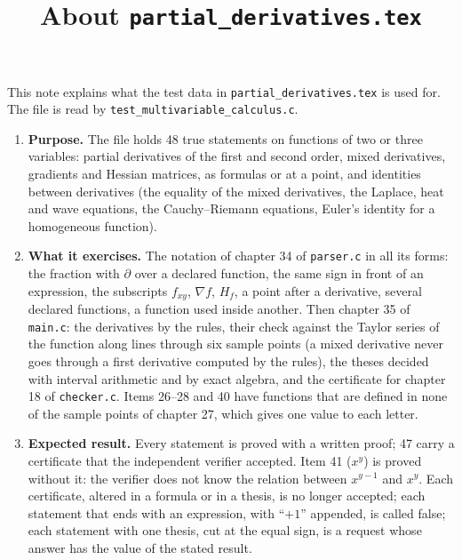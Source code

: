 \documentclass[11pt,a4paper]{article}
\title{About \texttt{partial\_derivatives.tex}}
\author{}
\date{}
\begin{document}
\maketitle
This note explains what the test data in \texttt{partial\_derivatives.tex} is used for. The file is read by \texttt{test\_multivariable\_calculus.c}.

\begin{enumerate}
\item \textbf{Purpose.} The file holds 48 true statements on functions of two or three variables: partial derivatives of the first and second order, mixed derivatives, gradients and Hessian matrices, as formulas or at a point, and identities between derivatives (the equality of the mixed derivatives, the Laplace, heat and wave equations, the Cauchy--Riemann equations, Euler's identity for a homogeneous function).

\item \textbf{What it exercises.} The notation of chapter 34 of \texttt{parser.c} in all its forms: the fraction with $\partial$ over a declared function, the same sign in front of an expression, the subscripts $f_{xy}$, $\nabla f$, $H_{f}$, a point after a derivative, several declared functions, a function used inside another. Then chapter 35 of \texttt{main.c}: the derivatives by the rules, their check against the Taylor series of the function along lines through six sample points (a mixed derivative never goes through a first derivative computed by the rules), the theses decided with interval arithmetic and by exact algebra, and the certificate for chapter 18 of \texttt{checker.c}. Items 26--28 and 40 have functions that are defined in none of the sample points of chapter 27, which gives one value to each letter.

\item \textbf{Expected result.} Every statement is proved with a written proof; 47 carry a certificate that the independent verifier accepted. Item 41 ($x^{y}$) is proved without it: the verifier does not know the relation between $x^{y - 1}$ and $x^{y}$. Each certificate, altered in a formula or in a thesis, is no longer accepted; each statement that ends with an expression, with ``$+ 1$'' appended, is called false; each statement with one thesis, cut at the equal sign, is a request whose answer has the value of the stated result.


\end{enumerate}
\end{document}
